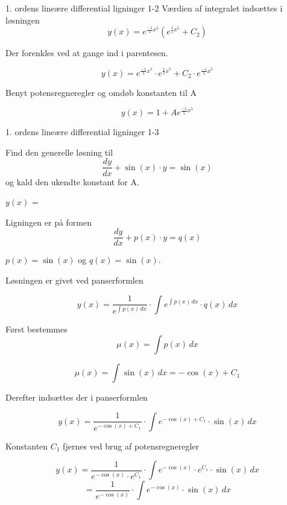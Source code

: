 \documentclass{article}
\begin{document}
\begin{exercise}{1. ordens lineære differential ligninger 1-2}
	Værdien af integralet indsættes i løsningen
	\[
	y(x) = e^{\frac{-1}{5}x^5} \left( e^{\frac{1}{5}x^5}+ C_2\right)
	\]
	
	\hint
	
	Der forenkles ved at gange ind i parentesen.
	
	\hint
	\[
	y(x) = e^{\frac{-1}{5}x^5} \cdot e^{\frac{1}{5}x^5} + C_2 \cdot e^{\frac{-1}{5}x^5} 
	\]
	
	\hint
	
	Benyt potensregneregler og omdøb konstanten til A
	
	\hint
	\[
	y(x) = 1 + A e^{\frac{-1}{5}x^5}
	\]
	
	
\end{exercise}

\newpage

\begin{exercise}{1. ordens lineære differential ligninger 1-3}
	
	
	Find den generelle løsning til
	\[
	\frac{dy}{dx} + \sin(x) \cdot y = \sin(x)
	\]
	og kald den ukendte konstant for A.
	
	$y(x)$ =  
	
	
	
	\hint
	
	Ligningen er på formen
	\[
	\frac{dy}{dx} + p(x) \cdot y = q(x)
	\]
	
	\hint
	
	$p(x)=\sin(x)$ og $q(x)=\sin(x)$.
	
	\hint
	
	Løsningen er givet ved panserformlen
	
	
	\hint
	
	\[
	y(x) = \frac{1}{e^{\int p(x) \, dx}} \cdot \int e^{\int p(x) \, dx}  \cdot q(x) \, dx
	\]
	
	\hint
	
	Først bestemmes 
	\[
	\mu(x) = \int p(x) \, dx
	\]
	
	\hint
	\[
	\mu(x) = \int \sin(x) \, dx = -\cos(x) + C_1
	\]
	
	\hint
	Derefter indsættes der i  panserformlen
	
	\hint
	
	\[
	y(x) = \frac{1}{e^{-\cos(x) + C_1}} \cdot \int e^{-\cos(x) + C_1}  \cdot \sin(x) \, dx
	\]
	
	
	\hint
	
	Konstanten $C_1$ fjernes ved brug af potensregneregler
	
	\hint
	\[
	y(x) = \frac{1}{e^{- \cos(x)} \cdot e^{C_1}} \cdot \int e^{-\cos(x)} \cdot e^{C_1}  \cdot \sin(x) \, dx
	\]
	\[
	= \frac{1}{e^{-\cos(x)}} \cdot \int e^{- \cos(x)}  \cdot \sin(x) \, dx
	\]
	

\end{exercise}
\end{document}
